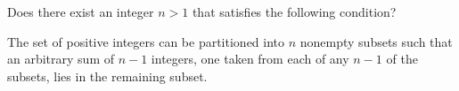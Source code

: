 Does there exist an integer $n > 1$ that satisfies the following condition?

The set of positive integers can be partitioned into $n$ nonempty subsets such that an arbitrary sum of $n - 1$ integers, one taken from each of any $n - 1$ of the subsets, lies in the remaining subset.
